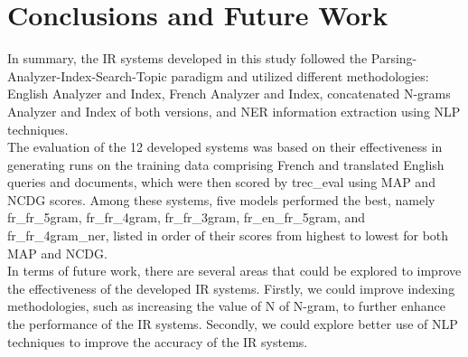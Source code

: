 \section{Conclusions and Future Work}
\label{sec:conclusion}

In summary, the IR systems developed in this study followed the Parsing-Analyzer-Index-Search-Topic paradigm and utilized different methodologies: English Analyzer and Index, French Analyzer and Index, 
concatenated N-grams Analyzer and Index of both versions, 
and NER information extraction using NLP techniques. \\
The evaluation of the 12 developed systems was based 
on their effectiveness in generating runs on the training 
data comprising French and translated English queries and
documents, which were then scored by trec\_eval using MAP 
and NCDG scores. Among these systems, five models performed
the best, namely fr\_fr\_5gram, fr\_fr\_4gram, fr\_fr\_3gram, 
fr\_en\_fr\_5gram, and fr\_fr\_4gram\_ner, listed in order of 
their scores from highest to lowest for both MAP and NCDG.\\
In terms of future work, there are several areas that could be explored
to improve the effectiveness of the developed IR systems. Firstly, 
we could improve indexing methodologies, such as increasing the value 
of N of N-gram, to further enhance the performance of the IR systems. 
Secondly,  we could explore better use of NLP techniques 
to improve the accuracy of the IR systems. \\